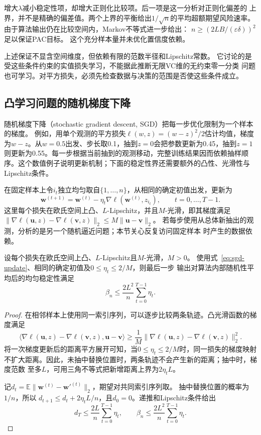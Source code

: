 增大$\lambda$减小稳定性项，却增大正则化比较项。后一项是这一分析对正则化偏差的
上界，并不是精确的偏差值。两个上界的平衡给出$1/\sqrt n$的平均超额期望风险速率。
由于算法输出仍在比较空间内，Markov不等式进一步给出：
$n\geq(2LB/(\varepsilon\delta))^2$足以保证PAC目标。
这个充分样本量并未优化置信度依赖。

上述保证不显含空间维度，但依赖有限的范数半径和Lipschitz常数。
它讨论的是受这些条件约束的实值损失学习，不能据此推断无限VC维的无约束零一分类
问题也可学习。对平方损失，必须先检查数据与决策的范围是否使这些条件成立。

\subsection{凸学习问题的随机梯度下降}
\label{sec:sgd-stability}

随机梯度下降（stochastic gradient descent, SGD）把每一步优化限制为一个样本的梯度。
例如，用单个观测的平方损失$\ell(w,z)=(w-z)^2/2$估计均值，梯度为$w-z$。从$w=0.5$出发、步长取0.1，抽到$z=0$会把参数更新为0.45，抽到$z=1$则更新为0.55。每一步根据当前抽到的观测移动，完整训练结果因而依赖抽样顺序。这个数值例子说明更新机制；下面的稳定性界还需要额外的凸性、光滑性与Lipschitz条件。

在固定样本上令$i_t$独立均匀取自$\{1,\ldots,n\}$，从相同的确定初值出发，更新为
\begin{equation}
 \bm w^{(t+1)}=\bm w^{(t)}-\eta_t\nabla\ell(\bm w^{(t)},z_{i_t}),
 \qquad t=0,\ldots,T-1.
 \label{eq:sgd-update}
\end{equation}
这里每个损失在欧氏空间上凸、$L$-Lipschitz，并且$M$-光滑，即其梯度满足
$\|\nabla\ell(\bm u,z)-\nabla\ell(\bm v,z)\|_2\leq M\|\bm u-\bm v\|_2$。
若每步使用从总体新抽出的观测，分析的是另一个随机逼近问题；本节关心反复访问固定样本
时产生的数据依赖。

\begin{theorem}[凸光滑SGD的稳定性]
\label{thm:convex-sgd-stability}
设每个损失在欧氏空间上凸、$L$-Lipschitz且$M$-光滑，$M>0$。
使用式~\eqref{eq:sgd-update}、相同的确定初值及$0\leq\eta_t\leq2/M$，则最后一步
输出对算法内部随机性平均后的均匀稳定性满足
\[
 \beta_n\leq\frac{2L^2}{n}\sum_{t=0}^{T-1}\eta_t.
\]
\end{theorem}
\begin{proof}
在相邻样本上使用同一索引序列，可以逐步比较两条轨迹。凸光滑函数的梯度满足
\[
 \langle\nabla\ell(\bm u,z)-\nabla\ell(\bm v,z),\bm u-\bm v\rangle
 \geq\frac1M\|\nabla\ell(\bm u,z)-\nabla\ell(\bm v,z)\|_2^2.
\]
将一次梯度更新后的距离平方展开可知，当$0\leq\eta_t\leq2/M$时，同一损失的梯度映射
不扩大距离。因此，未抽中替换位置时，两条轨迹不会产生新的距离；抽中时，梯度范数
至多$L$，可用三角不等式把新增距离上界为$2\eta_tL$。

记$d_t=\mathbb E\|\bm w^{(t)}-\bm w'^{(t)}\|_2$，期望对共同索引序列取。
抽中替换位置的概率为$1/n$，所以
$d_{t+1}\leq d_t+2\eta_tL/n$，且$d_0=0$。递推和Lipschitz条件给出
\begin{equation}
 d_T\leq\frac{2L}{n}\sum_{t=0}^{T-1}\eta_t,
 \qquad
 \beta_n\leq\frac{2L^2}{n}\sum_{t=0}^{T-1}\eta_t.
 \label{eq:convex-sgd-stability}
\end{equation}
\end{proof}

